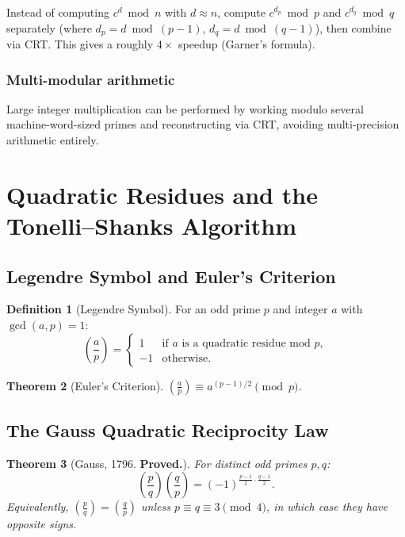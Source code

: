 \documentclass[12pt,a4paper]{amsart}
\newtheorem{theorem}{Theorem}[section]
\theoremstyle{definition}
\newtheorem{definition}[theorem]{Definition}
\begin{document}
Instead of computing $c^d \bmod n$ with $d \approx n$, compute
$c^{d_p} \bmod p$ and $c^{d_q} \bmod q$ separately (where
$d_p = d \bmod (p-1)$, $d_q = d \bmod (q-1)$), then combine via CRT.
This gives a roughly $4\times$ speedup (Garner's formula).

\subsubsection*{Multi-modular arithmetic}

Large integer multiplication can be performed by working modulo several
machine-word-sized primes and reconstructing via CRT, avoiding multi-precision
arithmetic entirely.

\section{Quadratic Residues and the Tonelli--Shanks Algorithm}

\subsection{Legendre Symbol and Euler's Criterion}

\begin{definition}[Legendre Symbol]
For an odd prime $p$ and integer $a$ with $\gcd(a,p)=1$:
\[
  \left(\frac{a}{p}\right) =
  \begin{cases} 1 & \text{if } a \text{ is a quadratic residue mod } p,\\
                -1 & \text{otherwise.}
  \end{cases}
\]
\end{definition}

\begin{theorem}[Euler's Criterion]
$\left(\frac{a}{p}\right) \equiv a^{(p-1)/2} \pmod{p}$.
\end{theorem}

\subsection{The Gauss Quadratic Reciprocity Law}

\begin{theorem}[Gauss, 1796. \textbf{Proved.}]
For distinct odd primes $p, q$:
\[
  \left(\frac{p}{q}\right)\left(\frac{q}{p}\right) =
  (-1)^{\tfrac{p-1}{2}\cdot\tfrac{q-1}{2}}.
\]
Equivalently, $\left(\frac{p}{q}\right) = \left(\frac{q}{p}\right)$ unless
$p \equiv q \equiv 3 \pmod{4}$, in which case they have opposite signs.
\end{theorem}
\end{document}
